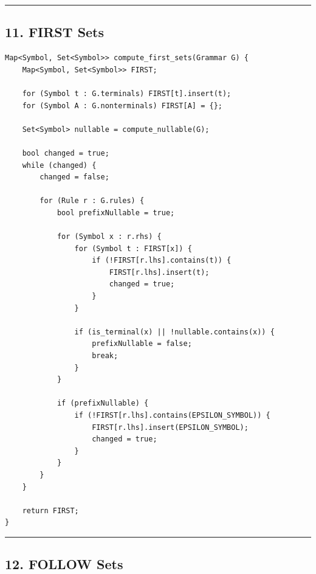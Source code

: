 \documentclass[10pt,letterpaper]{article}
\begin{document}
\medskip\hrule\medskip

\subsection*{11. FIRST Sets}

\begin{verbatim}
Map<Symbol, Set<Symbol>> compute_first_sets(Grammar G) {
    Map<Symbol, Set<Symbol>> FIRST;

    for (Symbol t : G.terminals) FIRST[t].insert(t);
    for (Symbol A : G.nonterminals) FIRST[A] = {};

    Set<Symbol> nullable = compute_nullable(G);

    bool changed = true;
    while (changed) {
        changed = false;

        for (Rule r : G.rules) {
            bool prefixNullable = true;

            for (Symbol x : r.rhs) {
                for (Symbol t : FIRST[x]) {
                    if (!FIRST[r.lhs].contains(t)) {
                        FIRST[r.lhs].insert(t);
                        changed = true;
                    }
                }

                if (is_terminal(x) || !nullable.contains(x)) {
                    prefixNullable = false;
                    break;
                }
            }

            if (prefixNullable) {
                if (!FIRST[r.lhs].contains(EPSILON_SYMBOL)) {
                    FIRST[r.lhs].insert(EPSILON_SYMBOL);
                    changed = true;
                }
            }
        }
    }

    return FIRST;
}
\end{verbatim}

\medskip\hrule\medskip

\subsection*{12. FOLLOW Sets}
\end{document}
